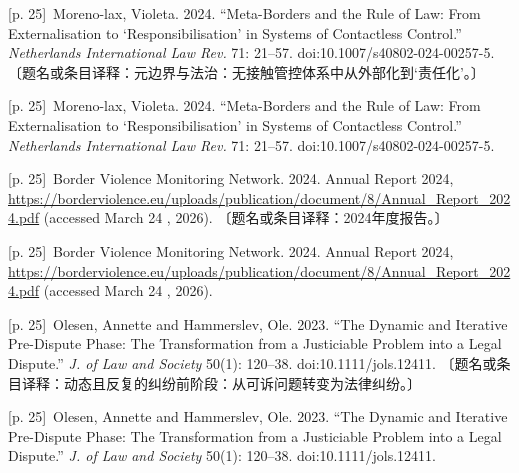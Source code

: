 \documentclass[10pt,a4paper]{article}
\begin{document}
\noindent\begin{minipage}{\textwidth}\begin{minipage}[t]{\dimexpr.5\textwidth-4mm\relax}{\scriptsize\color{gray} [p. 25]}\ Moreno-lax, Violeta. 2024. “Meta-Borders and the Rule of Law: From Externalisation to ‘Responsibilisation’ in Systems of Contactless Control.” \textit{Netherlands International Law Rev.} 71: 21–57. doi:10.1007/s40802-024-00257-5. 〔题名或条目译释：元边界与法治：无接触管控体系中从外部化到‘责任化’。〕\par\end{minipage}\hfill\begin{minipage}[t]{\dimexpr.5\textwidth-4mm\relax}{\scriptsize\color{gray} [p. 25]}\ Moreno-lax, Violeta. 2024. “Meta-Borders and the Rule of Law: From Externalisation to ‘Responsibilisation’ in Systems of Contactless Control.” \textit{Netherlands International Law Rev.} 71: 21–57. doi:10.1007/s40802-024-00257-5.\par\end{minipage}\end{minipage}\par
\noindent\begin{minipage}{\textwidth}\begin{minipage}[t]{\dimexpr.5\textwidth-4mm\relax}{\scriptsize\color{gray} [p. 25]}\ Border Violence Monitoring Network. 2024. Annual Report 2024, \url{https://borderviolence.eu/uploads/publication/document/8/Annual_Report_2024.pdf} (accessed March 24 , 2026). 〔题名或条目译释：2024年度报告。〕\par\end{minipage}\hfill\begin{minipage}[t]{\dimexpr.5\textwidth-4mm\relax}{\scriptsize\color{gray} [p. 25]}\ Border Violence Monitoring Network. 2024. Annual Report 2024, \url{https://borderviolence.eu/uploads/publication/document/8/Annual_Report_2024.pdf} (accessed March 24 , 2026).\par\end{minipage}\end{minipage}\par
\noindent\begin{minipage}{\textwidth}\begin{minipage}[t]{\dimexpr.5\textwidth-4mm\relax}{\scriptsize\color{gray} [p. 25]}\ Olesen, Annette and Hammerslev, Ole. 2023. “The Dynamic and Iterative Pre-Dispute Phase: The Transformation from a Justiciable Problem into a Legal Dispute.” \textit{J. of Law and Society} 50(1): 120–38. doi:10.1111/jols.12411. 〔题名或条目译释：动态且反复的纠纷前阶段：从可诉问题转变为法律纠纷。〕\par\end{minipage}\hfill\begin{minipage}[t]{\dimexpr.5\textwidth-4mm\relax}{\scriptsize\color{gray} [p. 25]}\ Olesen, Annette and Hammerslev, Ole. 2023. “The Dynamic and Iterative Pre-Dispute Phase: The Transformation from a Justiciable Problem into a Legal Dispute.” \textit{J. of Law and Society} 50(1): 120–38. doi:10.1111/jols.12411.\par\end{minipage}\end{minipage}\par
\end{document}
